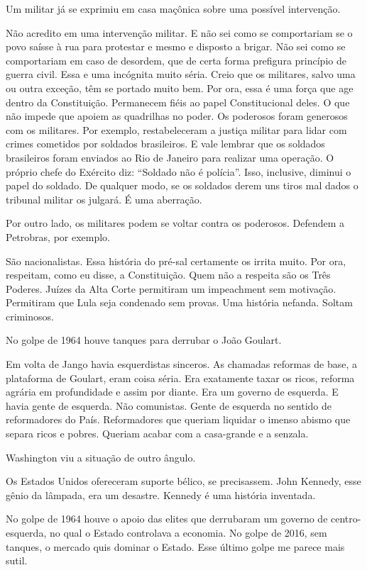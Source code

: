 \falaG Um militar já se exprimiu em casa maçônica sobre uma possível
intervenção.

\falaM Não acredito em uma intervenção militar. E não sei como se
comportariam se o povo saísse à rua para protestar e mesmo e disposto a
brigar. Não sei como se comportariam em caso de desordem, que de certa
forma prefigura princípio de guerra civil. Essa e uma incógnita muito
séria. Creio que os militares, salvo uma ou outra exceção, têm se
portado muito bem. Por ora, essa é uma força que age dentro da
Constituição. Permanecem fiéis ao papel Constitucional deles. O que não
impede que apoiem as quadrilhas no poder. Os poderosos foram generosos
com os militares. Por exemplo, restabeleceram a justiça militar para
lidar com crimes cometidos por soldados brasileiros. E vale lembrar que
os soldados brasileiros foram enviados ao Rio de Janeiro para realizar
uma operação. O próprio chefe do Exército diz: ``Soldado não é
polícia''. Isso, inclusive, diminui o papel do soldado. De qualquer
modo, se os soldados derem uns tiros mal dados o tribunal militar os
julgará. É uma aberração.

\falaG Por outro lado, os militares podem se voltar contra os poderosos.
Defendem a Petrobras, por exemplo.

\falaM São nacionalistas. Essa história do pré-sal certamente os irrita
muito. Por ora, respeitam, como eu disse, a Constituição. Quem não a
respeita são os Três Poderes. Juízes da Alta Corte permitiram um
impeachment sem motivação. Permitiram que Lula seja condenado sem
provas. Uma história nefanda. Soltam criminosos.

\falaG No golpe de 1964 houve tanques
para derrubar o João Goulart.

\falaM Em volta de Jango havia esquerdistas sinceros. As chamadas reformas
de base, a plataforma de Goulart, eram coisa séria. Era exatamente taxar
os ricos, reforma agrária em profundidade e assim por diante. Era um
governo de esquerda. E havia gente de esquerda. Não comunistas. Gente de
esquerda no sentido de reformadores do País. Reformadores que queriam
liquidar o imenso abismo que separa ricos e pobres. Queriam acabar com a
casa-grande e a senzala.

\falaG Washington viu a situação de outro ângulo.

\falaM Os Estados Unidos ofereceram suporte bélico, se precisassem. John
Kennedy, esse gênio da lâmpada, era um desastre. Kennedy é uma história
inventada.

\falaG No golpe de 1964 houve o apoio das elites que derrubaram um governo
de centro-esquerda, no qual o Estado controlava a economia. No golpe de
2016, sem tanques, o mercado quis dominar o Estado. Esse último golpe me
parece mais sutil.

